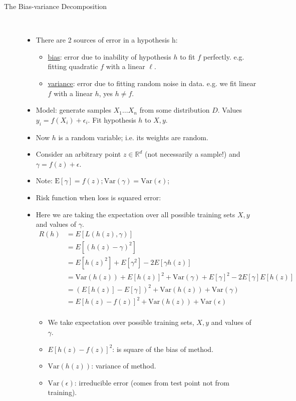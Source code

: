 \documentclass[10pt]{article}
\begin{document}
\begin{description}
	\item[The Bias-variance Decomposition]
	\
	\begin{itemize}
		\item There are 2 sources of error in a hypothesis h:
			\begin{itemize}
				\item \underline{bias}: error due to inability of hypothesis $h$ to fit $f$ perfectly. e.g. fitting quadratic $f$ with a linear $\ell$.
				\item \underline{variance}: error due to fitting random noise in data. e.g. we fit linear $f$ with a linear $h$, yes $h \neq f$.
			\end{itemize}
		\item Model: generate samples $X_{1} \dots X_{n}$ from some distribution $D$. Values $y_{i} = f(X_{i}) + \epsilon_{i}$. Fit hypothesis $h$ to $X, y$.
		\item Now $h$ is a random variable; i.e. its weights are random.
		\item Consider an arbitrary point $z \in \mathbb{R}^{d}$ (not necessarily a sample!) and $\gamma = f(z) + \epsilon$.
		\item Note: $\text{E}[\gamma] = f(z) ; \text{Var}(\gamma) = \text{Var}(\epsilon)$;
		\item Risk function when loss is squared error:
		\item Here we are taking the expectation over all possible training sets $X,y$ and values of $\gamma$.
			\begin{align*}
				R(h) &= E[L(h(z), \gamma)]\\
					&= E[(h(z) - \gamma)^{2}]\\
					&= E[h(z)^{2}] + E[\gamma^{2}] - 2E[\gamma h(z)]\\
					&= \text{Var}(h(z)) + E[h(z)]^{2} + \text{Var}(\gamma) + E[\gamma]^{2} - 2E[\gamma]E[h(z)]\\
					&= (E[h(z)] - E[\gamma])^{2} + \text{Var}(h(z)) + \text{Var}(\gamma)\\
					&= E[h(z) - f(z)]^{2} + \text{Var}(h(z)) + \text{Var}(\epsilon)\\
			\end{align*}
			\begin{itemize}
				\item We take expectation over possible training sets, $X, y$ and values of $\gamma$.
				\item $E[h(z) - f(z)]^{2}$: is square of the bias of method.
				\item $\text{Var}(h(z))$: variance of method.
				\item $\text{Var}(\epsilon)$: irreducible error (comes from test point not from training).
			\end{itemize}
			

\end{itemize}
\end{description}
\end{document}

